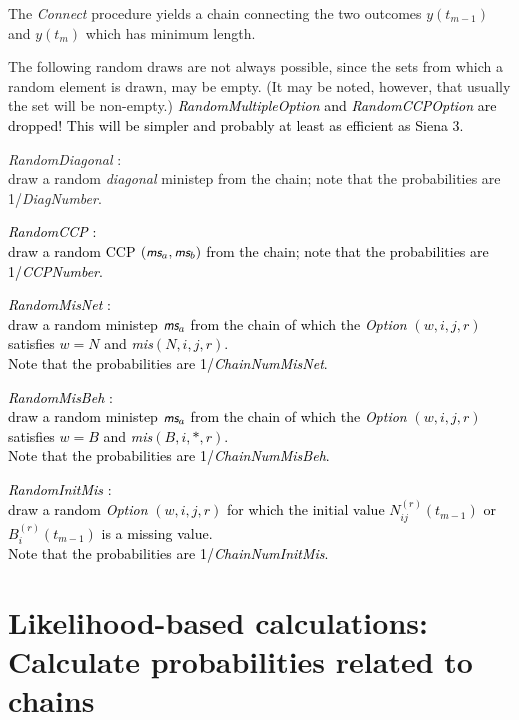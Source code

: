 \documentclass[a4paper,12pt,fleqn]{article}
\newcommand{\ms}{\textsl{\textsf{\small ms}}} %
\newcommand{\adda}[1]{{#1}}  %
\newcommand{\addaa}[1]{{\textcolor[named]{Black}{#1}}}  %
\newcommand{\addab}[1]{{\textcolor[named]{Black}{#1}}}  %
\begin{document}
\adda{
The \emph{Connect} procedure yields a chain connecting
the two outcomes $y(t_{m-1})$ and $y(t_m)$ which has minimum length.
}



The following random draws are not always possible, since the sets
from which a random element is drawn, may be empty.
(It may be noted, however, that usually the set will be non-empty.)
\addaa{ \emph{RandomMultipleOption}  and  \emph{RandomCCPOption} are dropped!
This will be simpler and probably at least as efficient as Siena 3.  }
\begin{enumerate}[resume]
\item \emph{RandomDiagonal}      :\\
      draw a random \textit{diagonal} ministep from the chain;
      note that the probabilities are 1/\textit{DiagNumber}.
\addaa{
\item \emph{RandomCCP}      :\\
      draw a random CCP $(\ms_a, \ms_b)$ from the chain;
      note that the probabilities are 1/\textit{CCPNumber}.
\item \emph{RandomMisNet}      :\\
      draw a random ministep $\ms_a$ from the chain
      of which the \textit{Option} $(w,i,j,r)$ satisfies
      $w=N$ and \textit{mis}$(N,i,j,r)$.\\
      Note that the probabilities are 1/\textit{ChainNumMisNet}.
\item \emph{RandomMisBeh}      :\\
      draw a random ministep $\ms_a$ from the chain
      of which the \textit{Option} $(w,i,j,r)$ satisfies
      $w=B$ and \textit{mis}$(B,i,*,r)$.\\
      Note that the probabilities are 1/\textit{ChainNumMisBeh}.
}
\addab{
\item \emph{RandomInitMis}      :\\
      draw a random \textit{Option} $(w,i,j,r)$
      for which
      the initial value $N_{ij}^{(r)}(t_{m-1})$
      or $B_{i}^{(r)}(t_{m-1})$ is a missing value.\\
      Note that the probabilities are 1/\textit{ChainNumInitMis}.
}
\end{enumerate}


\newpage
\section{Likelihood-based calculations:
     \protect\newline Calculate probabilities related to chains}
\label{S_prob}
\end{document}
